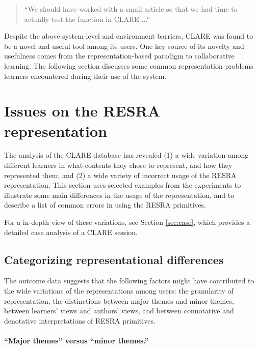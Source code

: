 \begin{itemizenoindent}
    \small
  \begin{quote}
   ``We should have worked with a small article so that we had time to
    actually test the function in CLARE ...''
  \end{quote}
  \normalsize
\end{itemizenoindent}

Despite the above system-level and environment barriers, CLARE
was found to be a novel and useful tool among its users. One key source of
its novelty and usefulness comes from the representation-based paradigm to
collaborative learning. The following section discusses some common
representation problems learners encountered during their use of the
system.


\section{Issues on the RESRA representation}
\label{sec:rep-issues}

The analysis of the CLARE database has revealed (1) a wide variation among
different learners in what contents they chose to represent, and how they
represented them; and (2) a wide variety of incorrect usage of the RESRA
representation.  This section uses selected examples from the experiments
to illustrate some main differences in the usage of the representation, and
to describe a list of common errors in using the RESRA primitives.

For a in-depth view of these variations, see Section \ref{sec:case}, which
provides a detailed case analysis of a CLARE session.


\subsection{Categorizing representational differences}
\label{key-rep-issues}

The outcome data suggests that the following factors might have contributed
to the wide variations of the representations among users: the granularity
of representation, the distinctions between major themes and minor themes,
between learners' views and authors' views, and between connotative and
denotative interpretations of RESRA primitives.


\paragraph{``Major themes'' versus ``minor themes.''}

